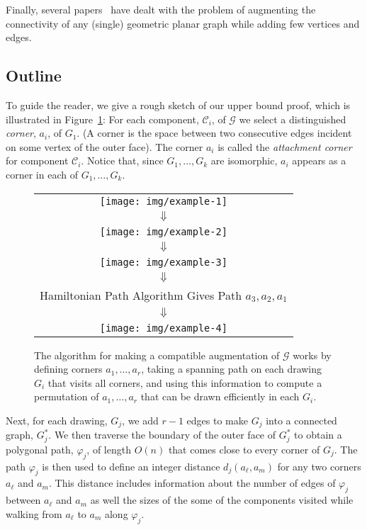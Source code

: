 \documentclass{patmorin}
\begin{document}
Finally, several papers~\cite{aghtu-acgg-08,rw-acpgg-12,t-capsg-12} have dealt with the problem of augmenting the connectivity of any (single) geometric planar graph while adding few vertices and edges.



\subsection{Outline}

To guide the reader, we give a rough sketch of our upper bound proof,
which is illustrated in Figure~\ref{figure:example}: For each component,
$\mathcal C_i$, of $\mathcal G$ we select a distinguished \emph{corner},
$a_i$, of $G_1$. (A corner is the space between two consecutive edges
incident on some vertex of the outer face). The corner $a_i$ is called
the \emph{attachment corner} for component $\mathcal C_i$.  Notice that,
since $G_1,\ldots,G_k$ are isomorphic, $a_i$ appears as a corner in each
of $G_1,\ldots,G_k$.

\begin{figure}
  \begin{center}
   \begin{tabular}{c}
     \texttt{[image: img/example-1]} \\[2ex]
     $\Downarrow$ \\
     \texttt{[image: img/example-2]} \\[2ex]
     $\Downarrow$ \\
     \texttt{[image: img/example-3]} \\[2ex]
     $\Downarrow$ \\
     Hamiltonian Path Algorithm Gives Path $a_3,a_2,a_1$ \\[2ex]
     $\Downarrow$ \\
     \texttt{[image: img/example-4]} 
   \end{tabular}
  \end{center}
  \caption{The algorithm for making a compatible augmentation of $\mathcal{G}$ works by defining corners $a_1,\ldots,a_r$, taking a spanning path on each drawing $G_i$ that visits all corners, and using this information to compute a permutation of $a_1,\ldots,a_r$ that can be drawn efficiently in each $G_i$.}
  \label{figure:example}
\end{figure}

Next, for each drawing, $G_j$, we add $r-1$ edges to make $G_j$ into a
connected graph, $G_j^*$.  We then traverse the boundary of the outer face
of $G_j^*$ to obtain a polygonal path, $\varphi_j$, of length $O(n)$ that comes
close to every corner of $G_j$.  The path $\varphi_j$ is then used to define an
integer distance $d_j(a_\ell,a_m)$ for any two corners $a_\ell$ and $a_m$. This distance includes information about the number of edges of $\varphi_j$ between $a_\ell$ and $a_m$ as well the sizes of the some of the components visited while walking from $a_\ell$ to $a_m$ along $\varphi_j$.
\end{document}

